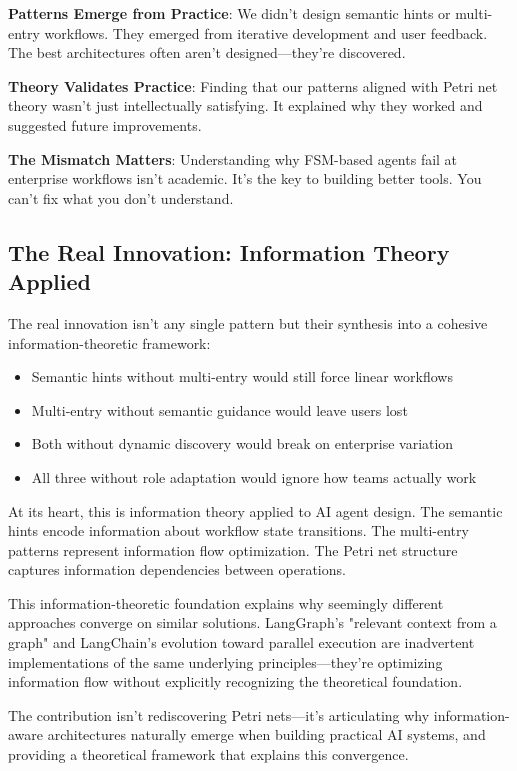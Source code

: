 \documentclass[11pt,a4paper]{article}
\begin{document}
\textbf{Patterns Emerge from Practice}: We didn't design semantic hints or multi-entry workflows. They emerged from iterative development and user feedback. The best architectures often aren't designed—they're discovered.

\textbf{Theory Validates Practice}: Finding that our patterns aligned with Petri net theory wasn't just intellectually satisfying. It explained why they worked and suggested future improvements.

\textbf{The Mismatch Matters}: Understanding why FSM-based agents fail at enterprise workflows isn't academic. It's the key to building better tools. You can't fix what you don't understand.

\subsection{The Real Innovation: Information Theory Applied}

The real innovation isn't any single pattern but their synthesis into a cohesive information-theoretic framework:
\begin{itemize}
\item Semantic hints without multi-entry would still force linear workflows
\item Multi-entry without semantic guidance would leave users lost
\item Both without dynamic discovery would break on enterprise variation
\item All three without role adaptation would ignore how teams actually work
\end{itemize}

At its heart, this is information theory applied to AI agent design. The semantic hints encode information about workflow state transitions. The multi-entry patterns represent information flow optimization. The Petri net structure captures information dependencies between operations.

This information-theoretic foundation explains why seemingly different approaches converge on similar solutions. LangGraph's "relevant context from a graph" and LangChain's evolution toward parallel execution are inadvertent implementations of the same underlying principles—they're optimizing information flow without explicitly recognizing the theoretical foundation.

The contribution isn't rediscovering Petri nets—it's articulating why information-aware architectures naturally emerge when building practical AI systems, and providing a theoretical framework that explains this convergence.
\end{document}

